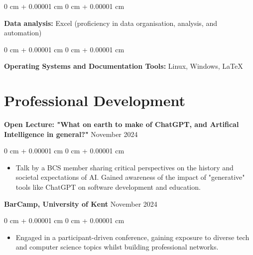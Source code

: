 \documentclass[10pt, letterpaper]{article}
\newenvironment{highlights}{
    \begin{itemize}[
        topsep=0.10 cm,
        parsep=0.10 cm,
        partopsep=0pt,
        itemsep=0pt,
        leftmargin=0 cm + 10pt
    ]
}{
    \end{itemize}
} %
\newenvironment{onecolentry}{
    \begin{adjustwidth}{
        0 cm + 0.00001 cm
    }{
        0 cm + 0.00001 cm
    }
}{
    \end{adjustwidth}
} %
\begin{document}
        \begin{onecolentry}
            \textbf{Data analysis:} Excel (proficiency in data organisation, analysis, and automation)
        \end{onecolentry}


    \vspace{0.05 cm}

        \begin{onecolentry}
            \textbf{Operating Systems and Documentation Tools:} Linux, Windows, LaTeX
        \end{onecolentry}


 \section{Professional Development}
   \textbf{Open Lecture: "What on earth to make of ChatGPT, and Artifical Intelligence in general?"} \hfill November 2024

        \vspace{0.05 cm}
        \begin{onecolentry}
            \begin{highlights}
                \item Talk by a BCS member sharing critical perspectives on the history and societal expectations of AI. Gained  awareness of the impact of "generative" tools like ChatGPT on software development and education.
            \end{highlights}
        \end{onecolentry}
        
     \vspace{0.2 cm}

     
 \textbf{BarCamp, University of Kent} \hfill November 2024

        \vspace{0.05 cm}
        \begin{onecolentry}
            \begin{highlights}
                \item Engaged in a participant-driven conference, gaining exposure to diverse tech and computer science topics whilst building professional networks.
            \end{highlights}
        \end{onecolentry}


        \vspace{0.05 cm}
\end{document}
